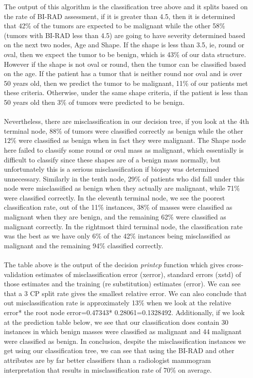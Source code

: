 \documentclass[a4paper, 12pt, one column, aas_macros]{article}
\begin{document}
The output of this algorithm is the classification tree above and it splits based on the rate of BI-RAD assessment, if it is greater than 4.5, then it is determined that 42\% of the tumors are expected to be malignant while the other 58\%  (tumors with BI-RAD less than 4.5) are going to have severity determined based on the next two nodes, Age and Shape. If the shape is less than 3.5, ie, round or oval, then we expect the tumor to be benign, which is 43\% of our data structure. However if the shape is not oval or round, then the tumor can be classified based on the age. If the patient has a tumor that is neither round nor oval and is over 50 years old, then we predict the tumor to be malignant, 11\% of our patients met these criteria. Otherwise, under the same shape criteria, if the patient is less than 50 years old then 3\% of tumors were predicted to be benign. \\
\\Nevertheless, there are misclassification in our decision tree, if you look at the 4th terminal node, 88\% of tumors were classified correctly as benign while the other 12\% were classified as benign when in fact they were malignant. The Shape node here failed to classify some round or oval mass as malignant, which essentially is difficult to classify since these shapes are of a benign mass normally, but unfortunately this is a serious misclassification if biopsy was determined unnecessary. Similarly in the tenth node, 29\% of patients who did fall under this node were misclassified as benign when they actually are malignant, while 71\% were classified correctly. In the eleventh terminal node, we see the poorest classification rate, out of the 11\% instances, 38\% of masses were classified as malignant when they are benign, and the remaining 62\% were classified as malignant correctly. In the rightmost third terminal node, the classification rate was the best as we have only 6\% of the 42\% instances being misclassified as malignant and the remaining 94\% classified correctly.\\
\\The table above is the output of the decision  \textit{printcp} function which gives cross-validation estimates of misclassification error (xerror), standard errors (xstd) of those estimates and the training (re substitution) estimates (error). We can see that a 3 CP split rate gives the smallest relative error. We can also conclude that out misclassification rate is approximately 13\% when we look at the relative error* the root node error=0.47343* 0.28061=0.1328492. Additionally, if we look at the prediction table below, we see that our classification does contain 30 instances in which benign masses were classified as malignant and 44 malignant were classified as benign. In conclusion, despite the misclassification instances we get using our classification tree, we can see that using the BI-RAD and other attributes are by far better classifiers than a radiologist mammogram interpretation that results in misclassification rate of 70\% on average.
\end{document}
